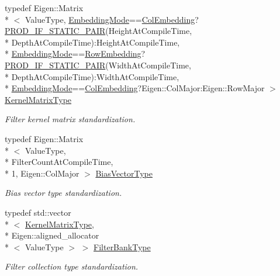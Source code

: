 \begin{DoxyCompactItemize}
typedef Eigen\-::\-Matrix\\*
$<$ Value\-Type, \hyperlink{namespaceffnn_1_1layer_a254f16beba4fb335d935e9b43bb9e69a}{Embedding\-Mode}==\hyperlink{namespaceffnn_1_1layer_a254f16beba4fb335d935e9b43bb9e69aa42ac01b35d45fd60256ef5008c96c049}{Col\-Embedding}?\hyperlink{receptive__volume_8h_a74feffebf310dd34521adc2adcaf64c9}{P\-R\-O\-D\-\_\-\-I\-F\-\_\-\-S\-T\-A\-T\-I\-C\-\_\-\-P\-A\-I\-R}(Height\-At\-Compile\-Time, \\*
Depth\-At\-Compile\-Time)\-:Height\-At\-Compile\-Time, \\*
\hyperlink{namespaceffnn_1_1layer_a254f16beba4fb335d935e9b43bb9e69a}{Embedding\-Mode}==\hyperlink{namespaceffnn_1_1layer_a254f16beba4fb335d935e9b43bb9e69aa91eb0d1f175a08e2b2991cae348c827d}{Row\-Embedding}?\hyperlink{receptive__volume_8h_a74feffebf310dd34521adc2adcaf64c9}{P\-R\-O\-D\-\_\-\-I\-F\-\_\-\-S\-T\-A\-T\-I\-C\-\_\-\-P\-A\-I\-R}(Width\-At\-Compile\-Time, \\*
Depth\-At\-Compile\-Time)\-:Width\-At\-Compile\-Time, \\*
\hyperlink{namespaceffnn_1_1layer_a254f16beba4fb335d935e9b43bb9e69a}{Embedding\-Mode}==\hyperlink{namespaceffnn_1_1layer_a254f16beba4fb335d935e9b43bb9e69aa42ac01b35d45fd60256ef5008c96c049}{Col\-Embedding}?Eigen\-::\-Col\-Major\-:\-Eigen\-::\-Row\-Major $>$ \hyperlink{classffnn_1_1layer_1_1_receptive_volume_af207f604ba81e52546c400dd85de014f}{Kernel\-Matrix\-Type}
\begin{DoxyCompactList}\small\item\em Filter kernel matrix standardization. \end{DoxyCompactList}\item 
typedef Eigen\-::\-Matrix\\*
$<$ Value\-Type, \\*
Filter\-Count\-At\-Compile\-Time, \\*
1, Eigen\-::\-Col\-Major $>$ \hyperlink{classffnn_1_1layer_1_1_receptive_volume_a22ec68a5323233ca8bbcacc2b7387dbb}{Bias\-Vector\-Type}
\begin{DoxyCompactList}\small\item\em Bias vector type standardization. \end{DoxyCompactList}\item 
typedef std\-::vector\\*
$<$ \hyperlink{classffnn_1_1layer_1_1_receptive_volume_af207f604ba81e52546c400dd85de014f}{Kernel\-Matrix\-Type}, \\*
Eigen\-::aligned\-\_\-allocator\\*
$<$ Value\-Type $>$ $>$ \hyperlink{classffnn_1_1layer_1_1_receptive_volume_a7c97795baaf3c9b1e7db3cb3841d8829}{Filter\-Bank\-Type}
\begin{DoxyCompactList}\small\item\em Filter collection type standardization. \end{DoxyCompactList}\end{DoxyCompactItemize}
